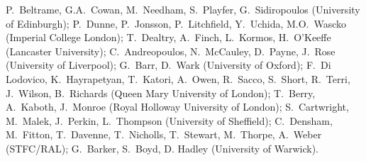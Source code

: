 
P.\ Beltrame, 
G.A.\ Cowan, 
M.\ Needham, 
S.\ Playfer, 
G.\ Sidiropoulos 
(University of Edinburgh); 
P.\ Dunne,
P.\ Jonsson,
P.\ Litchfield,
Y.\ Uchida, 
M.O.\ Wascko 
(Imperial College London); 
T.\ Dealtry, 
A.\ Finch, 
L.\ Kormos, 
H.\ O'Keeffe (Lancaster University);
C.\ Andreopoulos, 
N.\ McCauley, 
D.\ Payne, 
J.\ Rose (University of Liverpool); 
G.\ Barr, 
D.\ Wark 
(University of Oxford); 
F.\ Di Lodovico, 
K.\ Hayrapetyan,
T.\ Katori,
A.\ Owen, 
R.\ Sacco, 
S.\ Short, 
R.\ Terri, 
J.\ Wilson,
B.\ Richards 
 (Queen Mary University of London); 
T.\ Berry, 
A.\ Kaboth,
J.\ Monroe 
(Royal Holloway University of London);
S.\ Cartwright, 
M.\ Malek, 
J.\ Perkin, 
L.\ Thompson (University of Sheffield); 
C.\ Densham, 
M.\ Fitton, 
T.\ Davenne, 
T.\ Nicholls, 
T.\ Stewart, 
M.\ Thorpe, 
A.\ Weber  
(STFC/RAL); 
G.\ Barker, 
S.\ Boyd, 
D. Hadley (University of Warwick).
